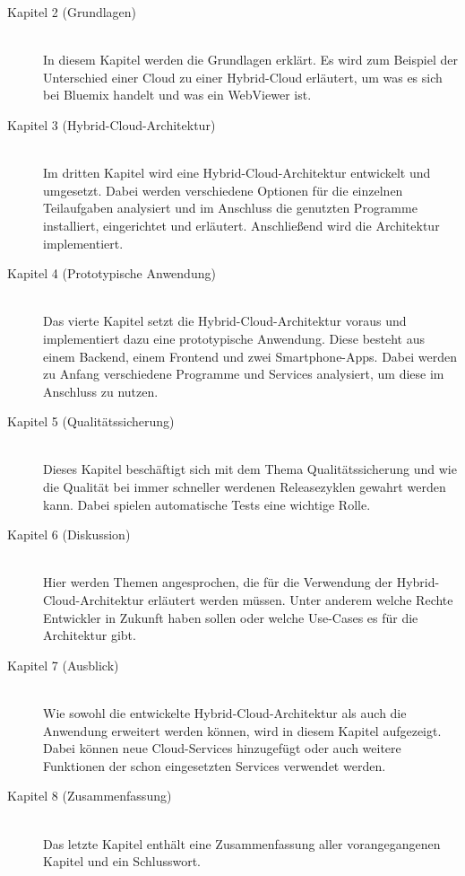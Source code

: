 \begin{description}

\item[Kapitel 2 (Grundlagen)]\hfill \\
In diesem Kapitel werden die Grundlagen erklärt. Es wird zum Beispiel der Unterschied einer Cloud zu einer Hybrid-Cloud
erläutert, um was es sich bei Bluemix handelt und was ein WebViewer ist.

\item[Kapitel 3 (Hybrid-Cloud-Architektur)]\hfill \\
Im dritten Kapitel wird eine Hybrid-Cloud-Architektur entwickelt und umgesetzt. Dabei werden verschiedene Optionen
für die einzelnen Teilaufgaben analysiert und im Anschluss die genutzten Programme installiert, eingerichtet und erläutert.
Anschließend wird die Architektur implementiert.

\item[Kapitel 4 (Prototypische Anwendung)]\hfill \\
Das vierte Kapitel setzt die Hybrid-Cloud-Architektur voraus und implementiert dazu eine prototypische Anwendung. Diese
besteht aus einem Backend, einem Frontend und zwei Smartphone-Apps. Dabei werden zu Anfang verschiedene Programme und
Services analysiert, um diese im Anschluss zu nutzen.

\item[Kapitel 5 (Qualitätssicherung)]\hfill \\
Dieses Kapitel beschäftigt sich mit dem Thema Qualitätssicherung und wie die Qualität bei immer schneller werdenen
Releasezyklen gewahrt werden kann. Dabei spielen automatische Tests eine wichtige Rolle.

\item[Kapitel 6 (Diskussion)]\hfill \\
Hier werden Themen angesprochen, die für die Verwendung der Hybrid-Cloud-\-Architektur erläutert werden müssen.
Unter anderem welche Rechte Entwickler in Zukunft haben sollen oder welche Use-Cases es für die Architektur gibt.

\item[Kapitel 7 (Ausblick)]\hfill \\
Wie sowohl die entwickelte Hybrid-\-Cloud-\-Architektur als auch die Anwendung erweitert werden können, wird in diesem
Kapitel aufgezeigt. Dabei können neue Cloud-Services hinzugefügt oder auch weitere Funktionen der schon eingesetzten
Services verwendet werden.

\item[Kapitel 8 (Zusammenfassung)]\hfill \\
Das letzte Kapitel enthält eine Zusammenfassung aller vorangegangenen Kapitel und ein Schlusswort.

\end{description}